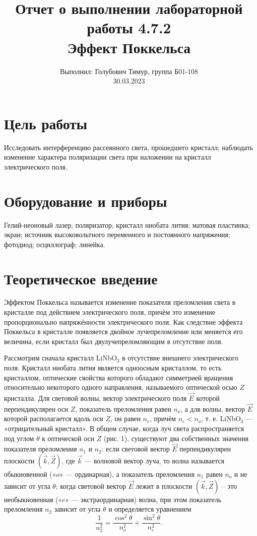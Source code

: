 \documentclass[12pt,a4paper]{article}
\author{\normalsize Выполнил: Голубович Тимур, группа Б01-108 \\
    	\normalsize 30.03.2023}
\date{}
\title{
    	\large Отчет о выполнении лабораторной работы 4.7.2 \\
    	\Large Эффект Поккельса\\
    }
\begin{document}
    	\maketitle
    	
    \section*{Цель работы}
    Исследовать интерференцию рассеянного света, прошедшего кристалл; наблюдать изменение характера поляризации света при наложении на кристалл электрического поля.
    
    
    \section*{Оборудование и приборы} 
    Гелий-неоновый лазер;
    поляризатор;
    кристалл ниобата лития;
    матовая пластинка;
    экран;
    источник высоковольтного переменного и постоянного напряжения;
    фотодиод;
    осциллограф;
    линейка.

	
\section*{Теоретическое введение}

	Эффектом Поккельса называется изменение показателя преломления света в кристалле под действием электрического поля, причём это изменение пропорционально напряжённости электрического поля. Как следствие эффекта Поккельса в кристалле появляется двойное лучепреломление или меняется его величина, если кристалл был двулучепреломляющим в отсутствие поля.
	
	
	Рассмотрим сначала кристалл LiNbO$_3$ в отсутствие внешнего электрического поля. Кристалл ниобата лития является одноосным кристаллом, то есть кристаллом, оптические свойства которого обладают симметрией вращения относительно некоторого одного направления, называемого оптической осью $Z$ кристалла. 
	Для световой волны, вектор электрического поля $\vec{E}$ которой перпендикулярен оси $Z$, показатель преломления равен $n_o$, а для волны, вектор $\vec{E}$ которой располагается вдоль оси $Z$, он равен $n_e$, причём $n_e < n_o$, т. е. LiNbO$_3$ — «отрицательный кристалл». В общем случае, когда луч света распространяется под углом $\theta$ к оптической оси $Z$ (рис. 1), существуют два собственных значения показателя преломления $n_1$ и $n_2$: если световой вектор $\vec{E}$ перпендикулярен плоскости $(\vec{k},\vec{Z})$, где $\vec{k}$ — волновой вектор луча, то волна называется обыкновенной («$o$» — ординарная), а показатель преломления $n_1$ равен $n_o$ и не зависит от угла $\theta$; когда световой вектор $\vec{E}$ лежит в плоскости $(\vec{k},\vec{Z})$ -- это необыкновенная («$e$» — экстраординарная) волна, при этом показатель преломления $n_2$ зависит от угла $\theta$ и определяется уравнением
	\begin{equation*}
		\frac{1}{n_2^2} = \frac{\cos^2\theta}{n_o^2} + \frac{\sin^2\theta}{n_e^2}.
	\end{equation*}
	
\end{document}
